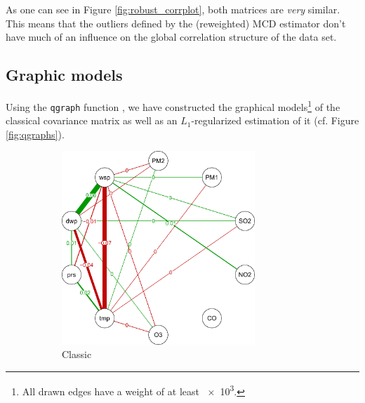 \documentclass[a4paper, 12pt]{article}
\begin{document}
    As one can see in Figure \ref{fig:robust_corrplot}, both matrices are \emph{very} similar. This means that the outliers defined by the (reweighted) MCD estimator don't have much of an influence on the global correlation structure of the data set.
    
    \subsection{Graphic models}
    
    Using the \texttt{qgraph} function \cite{qgraph}, we have constructed the graphical models\footnote{All drawn edges have a weight of at least \num{e3}.} of the classical covariance matrix as well as an $L_1$-regularized estimation of it (cf. Figure \ref{fig:qgraphs}).
    
    \begin{figure}[h]
        \centering
        \begin{subfigure}{0.49\textwidth}
            \centering
            \includegraphics[width=0.8\textwidth]{resources/pdf/qgraph_classic_cov.pdf}
            \caption{Classic}
        \end{subfigure}
        \begin{subfigure}{0.49\textwidth}
            \centering

\end{subfigure}
\end{figure}
\end{document}
